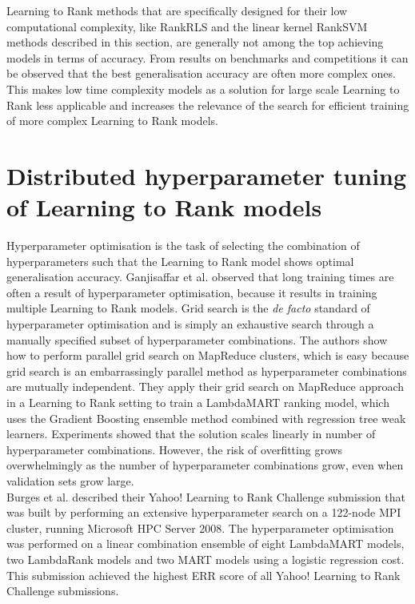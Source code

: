 Learning to Rank methods that are specifically designed for their low computational complexity, like RankRLS and the linear kernel Rank\ac{SVM} methods described in this section, are generally not among the top achieving models in terms of accuracy. From results on benchmarks and competitions it can be observed that the best generalisation accuracy are often more complex ones. This makes low time complexity models as a solution for large scale Learning to Rank less applicable and increases the relevance of the search for efficient training of more complex Learning to Rank models.\\ 

\section{Distributed hyperparameter tuning of Learning to Rank models}
Hyperparameter optimisation is the task of selecting the combination of hyperparameters such that the Learning to Rank model shows optimal generalisation accuracy. Ganjisaffar et al. \cite{Ganjisaffar2011, Ganjisaffar2011b} observed that long training times are often a result of hyperparameter optimisation, because it results in training multiple Learning to Rank models. Grid search is the \emph{de facto} standard of hyperparameter optimisation and is simply an exhaustive search through a manually specified subset of hyperparameter combinations. The authors show how to perform parallel grid search on MapReduce clusters, which is easy because grid search is an embarrassingly parallel method as hyperparameter combinations are mutually independent. They apply their grid search on MapReduce approach in a Learning to Rank setting to train a LambdaMART \cite{Wu2008} ranking model, which uses the Gradient Boosting \cite{Friedman2002} ensemble method combined with regression tree weak learners. Experiments showed that the solution scales linearly in number of hyperparameter combinations. However, the risk of overfitting grows overwhelmingly as the number of hyperparameter combinations grow, even when validation sets grow large.\\

Burges et al. \cite{Burges2011} described their Yahoo! Learning to Rank Challenge submission that was built by performing an extensive hyperparameter search on a 122-node \ac{MPI} cluster, running Microsoft HPC Server 2008. The hyperparameter optimisation was performed on a linear combination ensemble of eight LambdaMART models, two LambdaRank models and two MART models using a logistic regression cost. This submission achieved the highest \ac{ERR} score of all Yahoo! Learning to Rank Challenge submissions.\\

